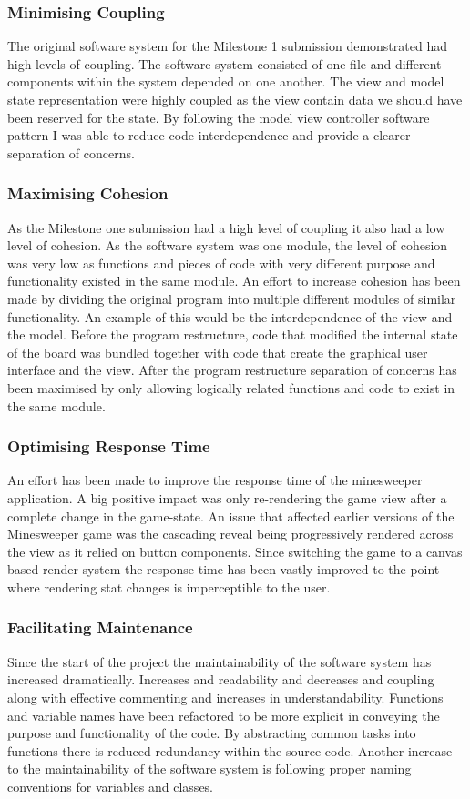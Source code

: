 \documentclass[12pt, a4]{report}
\begin{document}
\subsubsection{Minimising Coupling}
The original software system for the Milestone 1 submission demonstrated had high levels of coupling. The software system consisted of one file and different components within the system depended on one another. The view and model state representation were highly coupled as the view contain data we should have been reserved for the state. By following the model view controller software pattern I was able to reduce code interdependence and provide a clearer separation of concerns.


\subsubsection{Maximising Cohesion}
As the Milestone one submission had a high level of coupling it also had a low level of cohesion. As the software system was one module, the level of cohesion was very low as functions and pieces of code with very different purpose and functionality existed in the same module. An effort to increase cohesion has been made by dividing the original program into multiple different modules of similar functionality. An example of this would be the interdependence of the view and the model. Before the program restructure, code that modified the internal state of the board was bundled together with code that create the graphical user interface and the view. After the program restructure separation of concerns has been maximised by only allowing logically related functions and code to exist in the same module.

\subsubsection{Optimising Response Time}
An effort has been made to improve the response time of the minesweeper application. A big positive impact was only re-rendering the game view after a complete change in the game-state. An issue that affected earlier versions of the Minesweeper game was the cascading reveal being progressively rendered across the view as it relied on button components. Since switching the game to a canvas based render system the response time has been vastly improved to the point where rendering stat changes is imperceptible to the user.

\subsubsection{Facilitating Maintenance}
Since the start of the project the maintainability of the software system has increased dramatically. Increases and readability and decreases and coupling along with effective commenting and increases in understandability. Functions and variable names have been refactored to be more explicit in conveying the purpose and functionality of the code. By abstracting common tasks into functions there is reduced redundancy within the source code. Another increase to the maintainability of the software system is following proper naming conventions for variables and classes.
\end{document}
